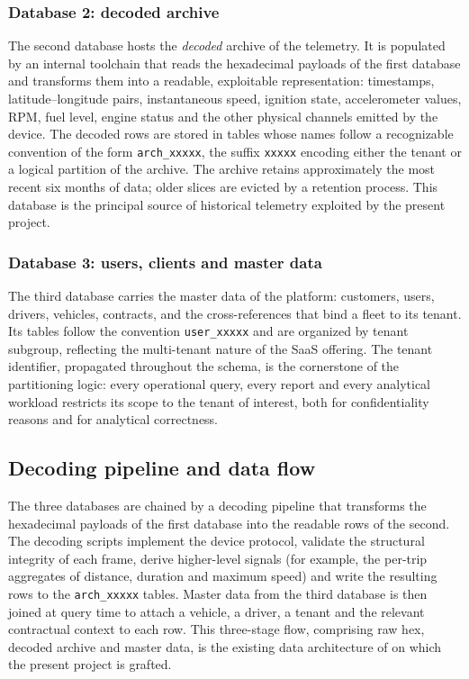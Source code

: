 \subsubsection{Database 2: decoded archive}
The second database hosts the \emph{decoded} archive of the telemetry. It is populated by an internal toolchain that reads the hexadecimal payloads of the first database and transforms them into a readable, exploitable representation: timestamps, latitude--longitude pairs, instantaneous speed, ignition state, accelerometer values, RPM, fuel level, engine status and the other physical channels emitted by the device. The decoded rows are stored in tables whose names follow a recognizable convention of the form \texttt{arch\_xxxxx}, the suffix \texttt{xxxxx} encoding either the tenant or a logical partition of the archive. The archive retains approximately the most recent six months of data; older slices are evicted by a retention process. This database is the principal source of historical telemetry exploited by the present project.

\subsubsection{Database 3: users, clients and master data}
The third database carries the master data of the platform: customers, users, drivers, vehicles, contracts, and the cross-references that bind a fleet to its tenant. Its tables follow the convention \texttt{user\_xxxxx} and are organized by tenant subgroup, reflecting the multi-tenant nature of the SaaS offering. The tenant identifier, propagated throughout the schema, is the cornerstone of the partitioning logic: every operational query, every report and every analytical workload restricts its scope to the tenant of interest, both for confidentiality reasons and for analytical correctness.

\subsection{Decoding pipeline and data flow}
The three databases are chained by a decoding pipeline that transforms the hexadecimal payloads of the first database into the readable rows of the second. The decoding scripts implement the device protocol, validate the structural integrity of each frame, derive higher-level signals (for example, the per-trip aggregates of distance, duration and maximum speed) and write the resulting rows to the \texttt{arch\_xxxxx} tables. Master data from the third database is then joined at query time to attach a vehicle, a driver, a tenant and the relevant contractual context to each row. This three-stage flow, comprising raw hex, decoded archive and master data, is the existing data architecture of \hostorg{} on which the present project is grafted.


